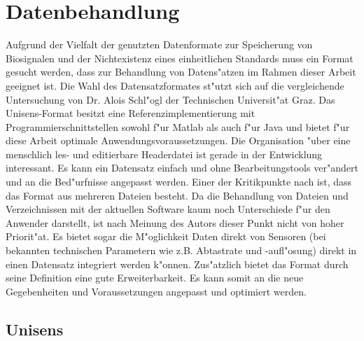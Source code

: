 \section{Datenbehandlung}

Aufgrund der Vielfalt der genutzten Datenformate zur Speicherung von Biosignalen und der Nichtexistenz eines einheitlichen Standards \cite{Schlogl2009, Varri2001, Wang2010} muss ein Format gesucht werden, dass zur Behandlung von Datens"atzen im Rahmen dieser Arbeit geeignet ist.
Die Wahl des Datensatzformates st"utzt sich auf die vergleichende Untersuchung \cite{Schlogl2009} von Dr. Alois Schl"ogl der Technischen Universit"at Graz.
Das Unisens-Format besitzt eine Referenzimplementierung mit Programmierschnittstellen sowohl f"ur Matlab als auch f"ur Java und bietet f"ur diese Arbeit optimale Anwendungsvoraussetzungen.
Die Organisation "uber eine menschlich les- und editierbare Headerdatei ist gerade in der Entwicklung interessant.
Es kann ein Datensatz einfach und ohne Bearbeitungstools ver"andert und an die Bed"urfnisse angepasst werden.
Einer der Kritikpunkte nach \cite{Schlogl2009} ist, dass das Format aus mehreren Dateien besteht.
Da die Behandlung von Dateien und Verzeichnissen mit der aktuellen Software kaum noch Unterschiede f"ur den Anwender darstellt, ist nach Meinung des Autors dieser Punkt nicht von hoher Priorit"at.
Es bietet sogar die M"oglichkeit Daten direkt von Sensoren (bei bekannten technischen Parametern wie z.B. Abtastrate und -aufl"osung) direkt in einen Datensatz integriert werden k"onnen.
Zus"atzlich bietet das Format durch seine Definition eine gute Erweiterbarkeit.
Es kann somit an die neue Gegebenheiten und Voraussetzungen angepasst und optimiert werden.


\subsection{Unisens}

